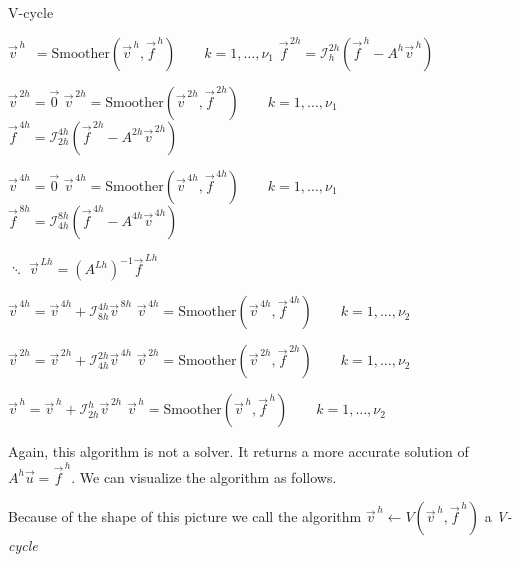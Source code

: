 \begin{algorithm}
    \caption{V-cycle}
    \begin{algorithmic} 
      \STATE $\vec{v}^{\,h} \enspace = \text{Smoother}(\vec{v}^{\,h}, \vec{f}^{\,h}) \qquad k=1, \ldots, \nu_1$ 
      \STATE $\vec{f}^{\,2h} = \mathcal{I}_{h}^{2h}(\vec{f}^{\,h} - A^h\vec{v}^{\,h})$

      \STATE \qquad $\vec{v}^{\,2h} = \vec{0}$ 
      \STATE \qquad $\vec{v}^{\,2h} = \text{Smoother}(\vec{v}^{\,2h}, \vec{f}^{\,2h}) \qquad k=1, \ldots, \nu_1$ 
      \STATE \qquad $\vec{f}^{\,4h} = \mathcal{I}_{2h}^{4h}(\vec{f}^{\,2h} - A^{2h}\vec{v}^{\,2h})$

      \STATE \qquad\qquad $\vec{v}^{\,4h} = \vec{0}$ 
      \STATE \qquad\qquad $\vec{v}^{\,4h} = \text{Smoother}(\vec{v}^{\,4h}, \vec{f}^{\,4h}) \qquad k=1, \ldots, \nu_1$ 
      \STATE \qquad\qquad $\vec{f}^{\,8h} = \mathcal{I}_{4h}^{8h}(\vec{f}^{\,4h} - A^{4h}\vec{v}^{\,4h})$

      \STATE \qquad\qquad\qquad $\ddots$
      \STATE \qquad\qquad\qquad\quad $\vec{v}^{\,Lh}=\left( A^{Lh} \right)^{-1}\vec{f}^{\,Lh}$
      \STATE \qquad\qquad\qquad {}

      \STATE \qquad\qquad $\vec{v}^{\,4h}  = \vec{v}^{\,4h} + \mathcal{I}_{8h}^{4h}\vec{v}^{\,8h}$
      \STATE \qquad\qquad $\vec{v}^{\,4h} = \text{Smoother}(\vec{v}^{\,4h}, \vec{f}^{\,4h}) \qquad k=1, \ldots, \nu_2$ 

      \STATE \qquad $\vec{v}^{\,2h}  = \vec{v}^{\,2h} + \mathcal{I}_{4h}^{2h}\vec{v}^{\,4h}$
      \STATE \qquad $\vec{v}^{\,2h} = \text{Smoother}(\vec{v}^{\,2h}, \vec{f}^{\,2h}) \qquad k=1, \ldots, \nu_2$ 

      \STATE $\vec{v}^{\,h}  = \vec{v}^{\,h} + \mathcal{I}_{2h}^{h}\vec{v}^{\,2h}$
      \STATE $\vec{v}^{\,h} = \text{Smoother}(\vec{v}^{\,h}, \vec{f}^{\,h}) \qquad k=1, \ldots, \nu_2$ 
    \end{algorithmic} 
\end{algorithm}
Again, this algorithm is not a solver. It returns a more accurate solution
of$A^h\vec{u} = \vec{f}^{\,h}$. We can visualize the algorithm as follows. 


\begin{center}
    
\end{center}

Because of the shape of this picture we call the algorithm $\vec{v}^{\,h}
\leftarrow V(\vec{v}^{\,h}, \vec{f}^{\,h})$ a \emph{V-cycle}

